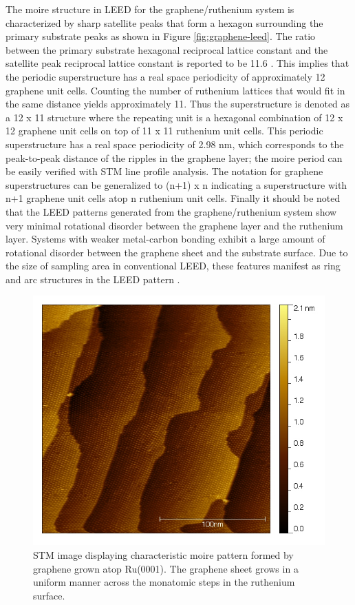 The moire structure in LEED for the graphene/ruthenium system is characterized by sharp satellite peaks that form a hexagon surrounding the primary substrate peaks as shown in Figure \ref{fig:graphene-leed}. The ratio between the primary substrate hexagonal reciprocal lattice constant and the satellite peak reciprocal lattice constant is reported to be 11.6 \cite{graphene-metals}. This implies that the periodic superstructure has a real space periodicity of approximately 12 graphene unit cells. Counting the number of ruthenium lattices that would fit in the same distance yields approximately 11. Thus the superstructure is denoted as a 12 x 11 structure where the repeating unit is a hexagonal combination of 12 x 12 graphene unit cells on top of 11 x 11 ruthenium unit cells. This periodic superstructure has a real space periodicity of 2.98 nm, which corresponds to the peak-to-peak distance of the ripples in the graphene layer; the moire period can be easily verified with STM line profile analysis.  The notation for graphene superstructures can be generalized to (n+1) x n indicating a superstructure with n+1 graphene unit cells atop n ruthenium unit cells. Finally it should be noted that the LEED patterns generated from the graphene/ruthenium system show very minimal rotational disorder between the graphene layer and the ruthenium layer. Systems with weaker metal-carbon bonding exhibit a large amount of rotational disorder between the graphene sheet and the substrate surface. Due to the size of sampling area in conventional LEED, these features manifest as ring and arc structures in the LEED pattern \cite{graphene-metals}. 
\begin{figure}
  \centering
  \includegraphics[scale=0.7]{./figs/graphene-ruthenium-stm.png}
  \caption{
  STM image displaying characteristic moire pattern formed by graphene grown atop Ru(0001). The graphene sheet grows in a uniform manner across the monatomic steps in the ruthenium surface.
  }
  \label{fig:ru-graphene-long}
\end{figure}

